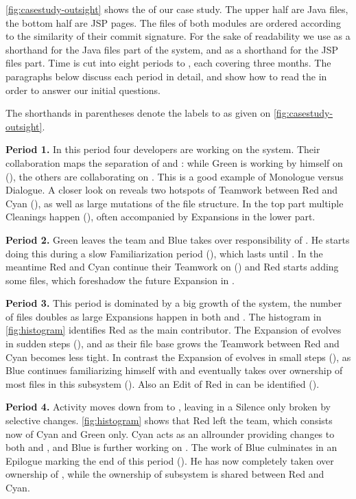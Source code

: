 \autoref{fig:casestudy-outsight} shows the \omap of our case study. The upper half are Java files, the bottom half are JSP pages. The files of both modules are ordered according to the similarity of their commit signature. For the sake of readability we use  as a shorthand for the Java files part of the system, and  as a shorthand for the JSP files part. Time is cut into eight periods  to , each covering three months. The paragraphs below discuss each period in detail, and show how to read the \omap in order to answer our initial questions.

The shorthands in parentheses denote the labels  to  as given on \autoref{fig:casestudy-outsight}.

\textbf{Period 1.} In this period four developers are working on the system. Their collaboration maps the separation of  and : while Green is working by himself on  (), the others are collaborating on . This is a good example of Monologue versus Dialogue. A closer look on  reveals two hotspots of Teamwork between Red and Cyan (), as well as large mutations of the file structure. In the top part multiple Cleanings happen (), often accompanied by Expansions in the lower part.

\textbf{Period 2.} Green leaves the team and Blue takes over responsibility of . He starts doing this during a slow Familiarization period (), which lasts until . In the meantime Red and Cyan continue their Teamwork on  () and Red starts adding some files, which foreshadow the future Expansion in .

\textbf{Period 3.} This period is dominated by a big growth of the system, the number of files doubles as large Expansions happen in both  and . The histogram in \autoref{fig:histogram} identifies Red as the main contributor. The Expansion of  evolves in sudden steps (), and as their file base grows the Teamwork between Red and Cyan becomes less tight. In contrast the Expansion of  evolves in small steps (), as Blue continues familiarizing himself with  and eventually takes over ownership of most files in this subsystem (). Also an Edit of Red in  can be identified ().

\textbf{Period 4.} Activity moves down from  to , leaving  in a Silence only broken by selective changes. \autoref{fig:histogram} shows that Red left the team, which consists now of Cyan and Green only. Cyan acts as an allrounder providing changes to both  and , and Blue is further working on . The work of Blue culminates in an Epilogue marking the end of this period (). He has now completely taken over ownership of , while the ownership of subsystem  is shared between Red and Cyan.

